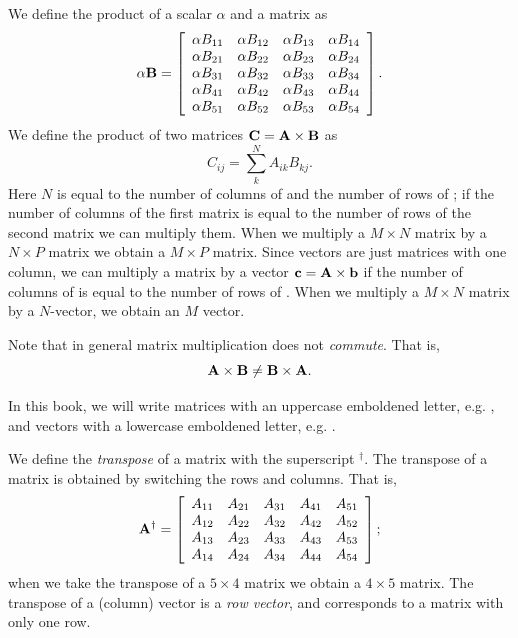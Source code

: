 We define the product of a scalar $\alpha$ and a matrix  as
\begin{equation}
	\alpha\mathbf{B} = 
		\left[\begin{array}{cccc}
	\alpha B_{11}  & \alpha B_{12}  & \alpha B_{13}  & \alpha B_{14}  \\
	\alpha B_{21}  & \alpha B_{22}  & \alpha B_{23}  & \alpha B_{24}  \\
	\alpha B_{31}  & \alpha B_{32}  & \alpha B_{33}  & \alpha B_{34}  \\
	\alpha B_{41}  & \alpha B_{42}  & \alpha B_{43}  & \alpha B_{44}  \\
	\alpha B_{51}  & \alpha B_{52}  & \alpha B_{53}  & \alpha B_{54}  \\
		\end{array}\right].
\end{equation}
We define the product of two matrices
$\mathbf{C}=\mathbf{A}\times\mathbf{B}$ as
\begin{equation}
	C_{ij} = \sum_k^N A_{ik}B_{kj}.
\end{equation}
Here $N$ is equal to the number of columns of  and the
number of rows of ; if the number of columns of the first
matrix is equal to the number of rows of the second matrix we can
multiply them. When we multiply a $M\times N$ matrix by a $N\times P$
matrix we obtain a $M\times P$ matrix. Since vectors are just matrices
with one column, we can multiply a matrix by a vector $\mathbf{c} =
\mathbf{A}\times\mathbf{b}$ if the number of columns of  is
equal to the number of rows of . When we multiply a $M\times
N$ matrix by a $N$-vector, we obtain an $M$ vector. 

Note that in general matrix multiplication does not
\emph{commute}. That is, 
\begin{equation}
	\mathbf{A}\times\mathbf{B} \neq \mathbf{B}\times\mathbf{A}.
\end{equation}

In this book, we will write matrices with an uppercase emboldened
letter, e.g. , and vectors with a lowercase emboldened
letter, e.g. .

We define the \emph{transpose} of a matrix with the superscript
$^\dag$. The transpose of a matrix is obtained by switching the rows
and columns. That is, 
\begin{equation}
	\mathbf{A}^\dag = 
		\left[\begin{array}{ccccc}
			A_{11} & A_{21} & A_{31} & A_{41} & A_{51}\\
			A_{12} & A_{22} & A_{32} & A_{42} & A_{52}\\
			A_{13} & A_{23} & A_{33} & A_{43} & A_{53}\\
			A_{14} & A_{24} & A_{34} & A_{44} & A_{54}\\
		\end{array}\right];
\end{equation}
when we take the transpose of a $5\times 4$ matrix we obtain a
$4\times 5$ matrix. The transpose of a (column) vector is a \emph{row
vector}, and corresponds to a matrix with only one row.

